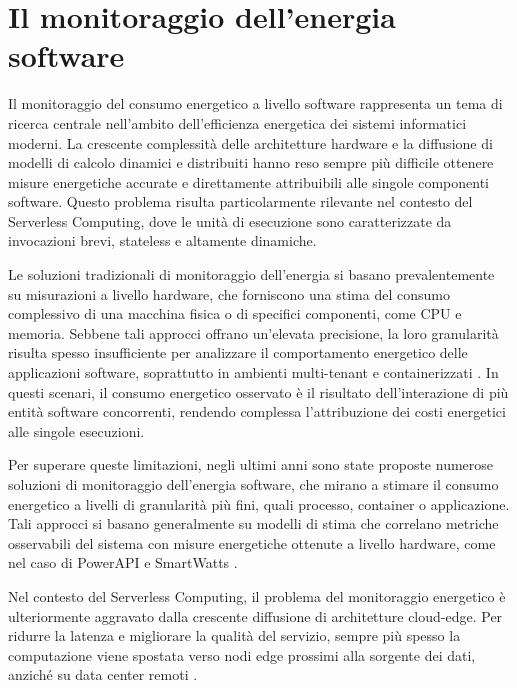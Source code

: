 \section{Il monitoraggio dell’energia software}

Il monitoraggio del consumo energetico a livello software rappresenta un tema di
ricerca centrale nell’ambito dell’efficienza energetica dei sistemi informatici moderni.
La crescente complessità delle architetture hardware e la diffusione di modelli di
calcolo dinamici e distribuiti hanno reso sempre più difficile ottenere misure
energetiche accurate e direttamente attribuibili alle singole componenti software.
Questo problema risulta particolarmente rilevante nel contesto del Serverless
Computing, dove le unità di esecuzione sono caratterizzate da invocazioni brevi,
stateless e altamente dinamiche.

Le soluzioni tradizionali di monitoraggio dell’energia si basano prevalentemente su
misurazioni a livello hardware, che forniscono una stima del consumo complessivo di
una macchina fisica o di specifici componenti, come CPU e memoria.
Sebbene tali approcci offrano un’elevata precisione, la loro granularità risulta spesso
insufficiente per analizzare il comportamento energetico delle applicazioni software,
soprattutto in ambienti multi-tenant e containerizzati \cite{lipp2021platypus}.
In questi scenari, il consumo energetico osservato è il risultato dell’interazione di
più entità software concorrenti, rendendo complessa l’attribuzione dei costi energetici
alle singole esecuzioni.

Per superare queste limitazioni, negli ultimi anni sono state proposte numerose
soluzioni di monitoraggio dell’energia software, che mirano a stimare il consumo
energetico a livelli di granularità più fini, quali processo, container o applicazione.
Tali approcci si basano generalmente su modelli di stima che correlano metriche
osservabili del sistema con misure energetiche ottenute a livello hardware, come nel
caso di PowerAPI e SmartWatts \cite{fieni:hal-02470128}.

Nel contesto del Serverless Computing, il problema del monitoraggio energetico è ulteriormente aggravato 
dalla crescente diffusione di architetture cloud-edge. 
Per ridurre la latenza e migliorare la qualità del servizio, 
sempre più spesso la computazione viene spostata verso nodi edge prossimi alla sorgente dei dati, 
anziché su data center remoti \cite{Shi2016_EdgeVisionChallenges}. 

